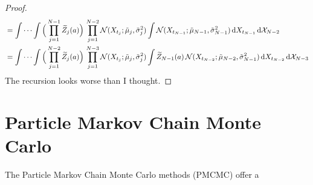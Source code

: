 \documentclass[10pt]{article}
\begin{document}
\begin{proof}
\begin{equation}
\begin{aligned}
		&=  \int \cdots \int \Big(\prod_{j=1}^{N-1} \widetilde Z_j(a)\Big) \,  \prod_{j=1}^{N-2} \mathcal N(X_{t_j}; \tilde \mu_j, \tilde \sigma_j^2) \int \mathcal N(X_{t_{N-1}}; \tilde \mu_{N-1}, \tilde \sigma_{N-1}^2) \, \mathrm{d} X_{t_{N-1}} \, \mathrm{d} \mathcal X_{N-2} \\
		&=  \int \cdots \int \Big(\prod_{j=1}^{N-2} \widetilde Z_j(a)\Big) \,  \prod_{j=1}^{N-3} \mathcal N(X_{t_j}; \tilde \mu_j, \tilde \sigma_j^2) \int \widetilde Z_{N-1}(a) \, \mathcal N(X_{t_{N-2}}; \tilde \mu_{N-2}, \tilde \sigma_{N-1}^2) \, \mathrm{d} X_{t_{N-2}} \, \mathrm{d} \mathcal X_{N-3} \\
	\end{aligned}
	\end{equation}
	{\color{red} The recursion looks worse than I thought.}
\end{proof}

\section{Particle Markov Chain Monte Carlo}

The Particle Markov Chain Monte Carlo methods (PMCMC) \cite{ADH10} offer a 




\end{document}
